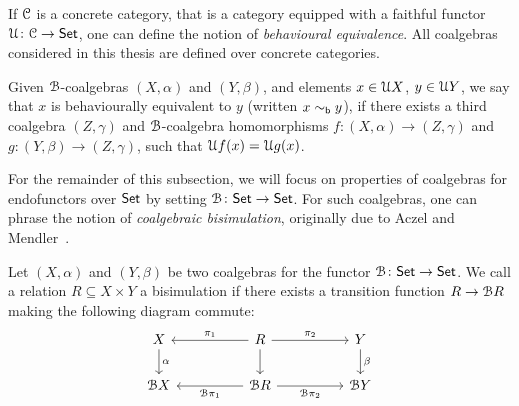 If $\mathcal{C}$ is a concrete category, that is a category equipped with a faithful functor $\mathcal{U} \colon \mathcal{C} \to {\mathsf{Set}}$, one can define the notion of \emph{behavioural equivalence}. All coalgebras considered in this thesis are defined over concrete categories.
\begin{definition}\label{c2:def:behavioural_equivalence}
Given $\mathcal{B}$-coalgebras $(X, \alpha)$ and $(Y, \beta)$, and elements $x \in \mathcal{U} X$, $y \in \mathcal{U} Y$, we say that $x$ is behaviourally equivalent to $y$ (written $x \sim_{\mathsf{b}} y$), if there exists a third coalgebra $(Z, \gamma)$ and $\mathcal{B}$-coalgebra homomorphisms $f \colon (X, \alpha) \to (Z, \gamma)$ and $g \colon (Y, \beta) \to (Z, \gamma)$, such that $\mathcal{U} f(x)=\mathcal{U} g(x)$.	
\end{definition}


For the remainder of this subsection, we will focus on properties of coalgebras for endofunctors over ${\mathsf{Set}}$ by setting $\mathcal{B} \colon {\mathsf{Set}} \to {\mathsf{Set}}$. For such coalgebras, one can phrase the notion of \emph{coalgebraic bisimulation}, originally due to Aczel and Mendler~\cite{Aczel:1989:Final}.
\begin{definition}\label{c2:def:bisimulation}
Let $(X, \alpha)$ and $(Y, \beta)$ be two coalgebras for the functor $\mathcal{B} \colon {\mathsf{Set}} \to {\mathsf{Set}}$. We call a relation ${R} \subseteq {X \times Y}$ a bisimulation if there exists a transition function $R \to \mathcal{B} R$ making the following diagram commute:
\[\begin{tikzcd}
	X && R && Y \\
	{\funB X} && {\funB R} && {\funB Y}
	\arrow["\alpha", from=1-1, to=2-1]
	\arrow["{\pi_1}"', from=1-3, to=1-1]
	\arrow["{\pi_2}", from=1-3, to=1-5]
	\arrow[from=1-3, to=2-3]
	\arrow["\beta", from=1-5, to=2-5]
	\arrow["{\funB \pi_1}", from=2-3, to=2-1]
	\arrow["{\funB \pi_2}"', from=2-3, to=2-5]
\end{tikzcd}\]	
\end{definition}

